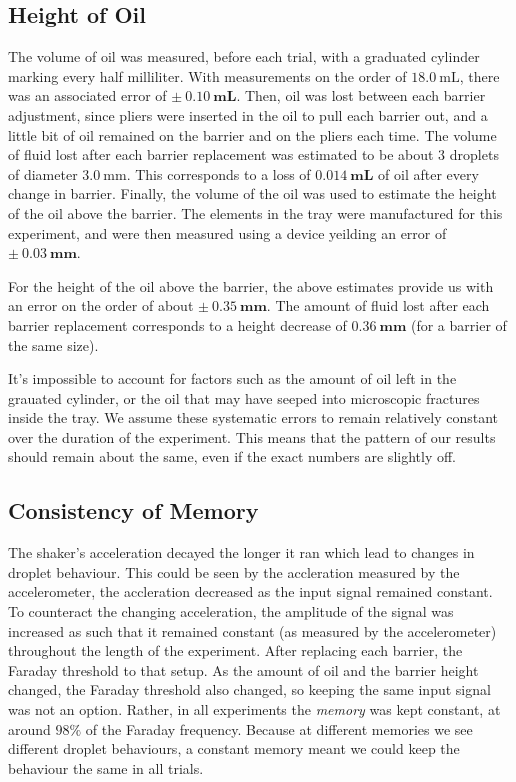     \subsection{Height of Oil}
The volume of oil was measured, before each trial, with a graduated cylinder marking every half milliliter. With measurements on the order of $18.0~\mathrm{mL}$, there was an associated error of $\mathbf{\pm~0.10~\mathrm{\textbf{mL}}}$. Then, oil was lost between each barrier adjustment, since pliers were inserted in the oil to pull each barrier out, and a little bit of oil remained on the barrier and on the pliers each time. The volume of fluid lost after each barrier replacement was estimated to be about 3 droplets of diameter $3.0~\mathrm{mm}$. This corresponds to a loss of $\mathbf{0.014~\mathrm{\textbf{mL}}}$ of oil after every change in barrier. 
Finally, the volume of the oil was used to estimate the height of the oil above the barrier. The elements in the tray were manufactured for this experiment, and were then measured using a device yeilding an error of $\mathbf{\pm~0.03~\mathrm{\textbf{mm}}}$. 

For the height of the oil above the barrier, the above estimates provide us with an error on the order of about $\mathbf{\pm~0.35~\mathrm{\textbf{mm}}}$. The amount of fluid lost after each barrier replacement corresponds to a height decrease of $\mathbf{0.36~\mathrm{\textbf{mm}}}$ (for a barrier of the same size).

It's impossible to account for factors such as the amount of oil left in the grauated cylinder, or the oil that may have seeped into microscopic fractures inside the tray. We assume these systematic errors to remain relatively constant over the duration of the experiment. This means that the pattern of our results should remain about the same, even if the exact numbers are slightly off. 

    \subsection{Consistency of Memory}
The shaker's acceleration decayed the longer it ran which lead to changes in droplet behaviour. This could be seen by the accleration measured by the accelerometer, the accleration decreased as the input signal remained constant. To counteract the changing acceleration, the amplitude of the signal was increased as such that it remained constant (as measured by the accelerometer) throughout the length of the experiment. After replacing each barrier, the Faraday threshold to that setup. As the amount of oil and the barrier height changed, the Faraday threshold also changed, so keeping the same input signal was not an option. Rather, in all experiments the \textit{memory} was kept constant, at around $98\%$ of the Faraday frequency. Because at different memories we see different droplet behaviours, a constant memory meant we could keep the behaviour the same in all trials. 

